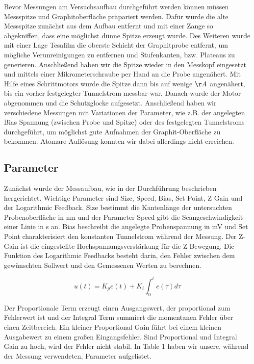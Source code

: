 \documentclass[10pt,a4paper]{article}
\begin{document}
Bevor Messungen am Versuchsaufbau durchgeführt werden können müssen Messspitze und Graphitoberfläche präpariert werden. Dafür wurde die alte Messspitze zunächst aus dem Aufbau entfernt und mit einer Zange so abgekniffen, dass eine möglichst dünne Spitze erzeugt wurde. Des Weiteren wurde mit einer Lage Tesafilm die oberste Schicht der Graphitprobe entfernt, um mögliche Verunreinigungen zu entfernen und Stufenkanten, bzw. Plateaus zu generieren. Anschließend haben wir die Spitze wieder in den Messkopf eingesetzt und mittels einer Mikrometerschraube per Hand an die Probe angenähert. Mit Hilfe eines Schrittmotors wurde die Spitze dann bis auf wenige $\AA$ angenähert, bis ein vorher festgelegter Tunnelstrom messbar war. Danach wurde der Motor abgenommen und die Schutzglocke aufgesetzt. Anschließend haben wir verschiedene Messungen mit Variationen der Parameter, wie z.B. der angelegten Bias Spannung (zwischen Probe und Spitze) oder des festgelegten Tunnelstroms durchgeführt, um möglichst gute Aufnahmen der Graphit-Oberfläche zu bekommen. Atomare Auflösung konnten wir dabei allerdings nicht erreichen.

\subsection{Parameter}

Zunächst wurde der Messaufbau, wie in der Durchführung beschrieben hergerichtet. Wichtige Parameter sind Size, Speed, Bias, Set Point, Z Gain und der Logarithmic Feedback. Size bestimmt die Kantenlänge der untersuchten Probenoberfläche in nm und der Parameter Speed gibt die Scangeschwindigkeit einer Linie in s an. Bias beschreibt die angelegte Probenspannung in mV und Set Point charakterisiert den konstanten Tunnelstrom während der Messung. Der Z-Gain ist die eingestellte Hochspannungsverstärkung für die Z-Bewegung. Die Funktion des Logarithmic Feedbacks besteht darin, den Fehler zwischen dem gewünschten Sollwert und den Gemessenen Werten zu berechnen. 

$$u(t) = K_{p}e(t)+K_{i}  \int_{0}^{t}e(\tau)d\tau$$

Der Proportionale Term erzeugt einen Ausgangswert, der proportional zum Fehlerwert ist und der Integral Term summiert die momentanen Fehler über einen Zeitbereich. Ein kleiner Proportional Gain führt bei einem kleinen Ausgabewert zu einem großen Eingangsfehler.  Sind Proportional und Integral Gain zu hoch, wird der Fehler nicht stabil. In Table 1 haben wir unsere, während der Messung verwendeten, Parameter aufgelistet.
\end{document}
